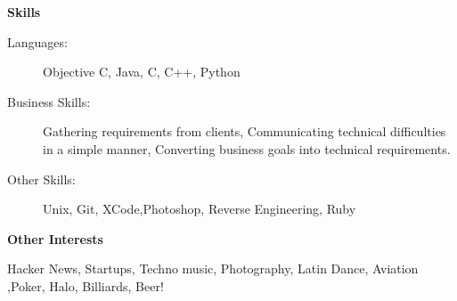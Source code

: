 \documentclass[letterpaper,11pt]{article}
\newcommand{\resheading}[1]{{\large \colorbox{mygrey}{\begin{minipage}{\textwidth}{\textbf{#1 \vphantom{p\^{E}}}}\end{minipage}}}}
\begin{document}
\resheading{Skills}
\begin{description}
\item[Languages:]
Objective C, Java, C, C++, Python
\item[Business Skills:]
Gathering requirements from clients, Communicating technical difficulties in a simple manner, Converting business goals into technical requirements.
\item[Other Skills:]
Unix, Git, XCode,Photoshop, Reverse Engineering, Ruby
\end{description}


\resheading{Other Interests}
\begin{description}
\item Hacker News, Startups, Techno music, Photography, Latin Dance, Aviation ,Poker, Halo, Billiards, Beer!
\end{description}
\end{document}
